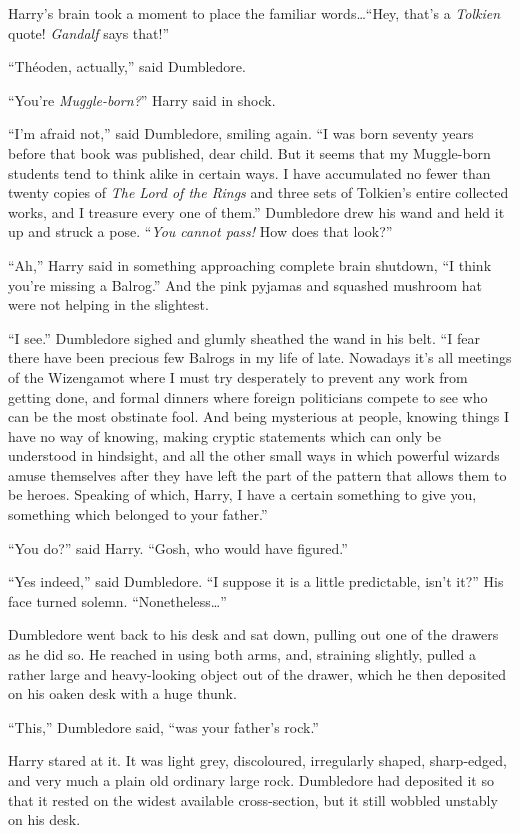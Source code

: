 Harry’s brain took a moment to place the familiar words…“Hey, that’s a \emph{Tolkien} quote! \emph{Gandalf} says that!”

“Théoden, actually,” said Dumbledore.

“You’re \emph{Muggle-born?}” Harry said in shock.

“I’m afraid not,” said Dumbledore, smiling again. “I was born seventy years before that book was published, dear child. But it seems that my Muggle-born students tend to think alike in certain ways. I have accumulated no fewer than twenty copies of \emph{The Lord of the Rings} and three sets of Tolkien’s entire collected works, and I treasure every one of them.” Dumbledore drew his wand and held it up and struck a pose. “\emph{You cannot pass!} How does that look?”

“Ah,” Harry said in something approaching complete brain shutdown, “I think you’re missing a Balrog.” And the pink pyjamas and squashed mushroom hat were not helping in the slightest.

“I see.” Dumbledore sighed and glumly sheathed the wand in his belt. “I fear there have been precious few Balrogs in my life of late. Nowadays it’s all meetings of the Wizengamot where I must try desperately to prevent any work from getting done, and formal dinners where foreign politicians compete to see who can be the most obstinate fool. And being mysterious at people, knowing things I have no way of knowing, making cryptic statements which can only be understood in hindsight, and all the other small ways in which powerful wizards amuse themselves after they have left the part of the pattern that allows them to be heroes. Speaking of which, Harry, I have a certain something to give you, something which belonged to your father.”

“You do?” said Harry. “Gosh, who would have figured.”

“Yes indeed,” said Dumbledore. “I suppose it is a little predictable, isn’t it?” His face turned solemn. “Nonetheless…”

Dumbledore went back to his desk and sat down, pulling out one of the drawers as he did so. He reached in using both arms, and, straining slightly, pulled a rather large and heavy-looking object out of the drawer, which he then deposited on his oaken desk with a huge thunk.

“This,” Dumbledore said, “was your father’s rock.”

Harry stared at it. It was light grey, discoloured, irregularly shaped, sharp-edged, and very much a plain old ordinary large rock. Dumbledore had deposited it so that it rested on the widest available cross-section, but it still wobbled unstably on his desk.

